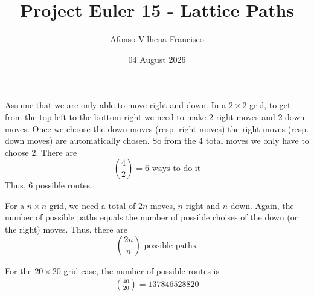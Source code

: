 \documentclass{article}
\title{Project Euler 15 - Lattice Paths}
\author{Afonso Vilhena Francisco}
\date{04 August 2026}
\begin{document}
\maketitle

Assume that we are only able to move right and down. In a $2\times2$ grid, to get from the top left to the bottom right we need to make 2 right moves and 2 down moves. Once we choose the down moves (resp. right moves) the right moves (resp. down moves) are automatically chosen. So from the $4$ total moves we only have to choose $2$. There are 
$${4 \choose2} = 6 \text{ ways to do it}  $$
Thus, $6$ possible routes.

\vspace{0.5cm}

For a $n \times n$ grid, we need a total of $2n$ moves, $n$ right and $n$ down. Again, the number of possible paths equals the number of possible choises of the down (or the right) moves. Thus, there are 
$${2n \choose n} \text{ possible paths}.$$

\vspace{0.5cm}

For the $20 \times 20$ grid case, the number of possible routes is
\begin{align*}
    \boxed{{40 \choose20}=137846528820}
\end{align*}
\end{document}
